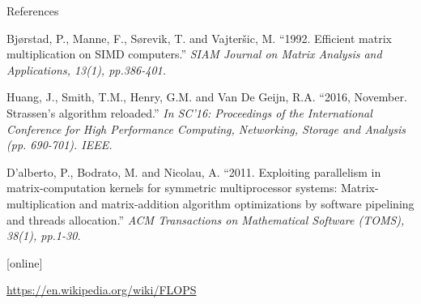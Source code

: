 \documentclass[UKenglish]{beamer}
\begin{document}
\begin{frame}[allowframebreaks]{References}
\begin{thebibliography}{}
        Bjørstad, P., Manne, F., Sørevik, T. and Vajteršic, M.
        \newblock \enquote{1992. Efficient matrix multiplication on SIMD
            computers.}
        \newblock \emph{SIAM Journal on Matrix Analysis and Applications,
            13(1), pp.386-401.}

        Huang, J., Smith, T.M., Henry, G.M. and Van De Geijn, R.A.
        \newblock \enquote{2016, November. Strassen's algorithm reloaded.}
        \newblock \emph{In SC'16: Proceedings of the International Conference
            for High Performance Computing, Networking, Storage and Analysis (pp. 690-701).
            IEEE.}

        D'alberto, P., Bodrato, M. and Nicolau, A.
        \newblock \enquote{2011. Exploiting parallelism in matrix-computation
            kernels for symmetric multiprocessor systems: Matrix-multiplication and
            matrix-addition algorithm optimizations by software pipelining and threads
            allocation.}
        \newblock \emph{ACM Transactions on Mathematical Software (TOMS),
            38(1), pp.1-30.}

        [online]

        \url{https://en.wikipedia.org/wiki/FLOPS}

    \end{thebibliography}
\end{frame}
\end{document}
